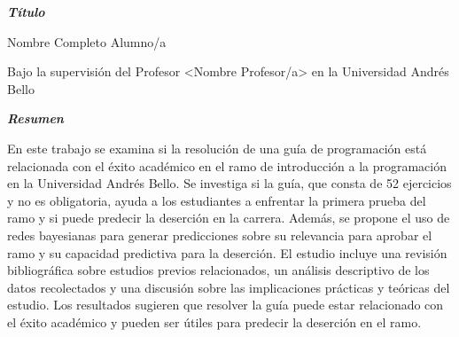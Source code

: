 \begin{center}
    \textbf{\LARGE \textit{Título}}
\end{center}

Nombre Completo Alumno/a

Bajo la supervisión del Profesor <Nombre Profesor/a> en la Universidad Andrés Bello

\begin{center}
    \textbf{\LARGE \textit{Resumen}}
\end{center}
En este trabajo se examina si la resolución de una guía de programación 
está relacionada con el éxito académico en el ramo de introducción a la 
programación en la Universidad Andrés Bello. Se investiga si la guía, que 
consta de 52 ejercicios y no es obligatoria, ayuda a los estudiantes 
a enfrentar la primera prueba del ramo y si puede predecir la deserción 
en la carrera. 
Además, se propone el uso de redes bayesianas para generar predicciones 
sobre su relevancia para aprobar el ramo y su capacidad predictiva para 
la deserción. El estudio incluye una revisión bibliográfica sobre estudios 
previos relacionados, un análisis descriptivo de los datos recolectados y 
una discusión sobre las implicaciones prácticas y teóricas del estudio. 
Los resultados sugieren que resolver la guía puede estar relacionado con 
el éxito académico y pueden ser útiles para predecir la deserción en el ramo.